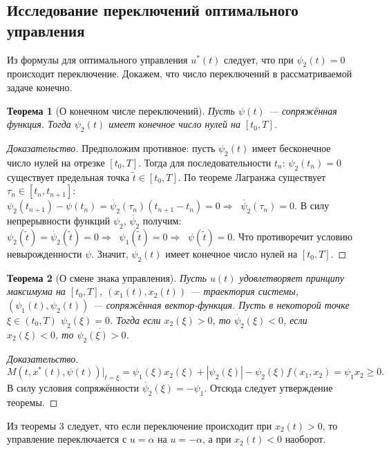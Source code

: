 \documentclass[11pt]{article}
\newtheorem{theorem}{Теорема}
\newcommand\abs[1]{\left\lvert#1\right\rvert}
\begin{document}
\subsection{Исследование переключений оптимального управления}
Из формулы для оптимального управления $u^*(t)$ следует, что при $\psi_2(t) = 0$ происходит переключение. Докажем, что число переключений в рассматриваемой задаче конечно.
\begin{theorem}[О конечном числе переключений]
Пусть $\psi(t)$ --- сопряжённая функция. Тогда $\psi_2(t)$ имеет конечное число нулей на $[t_0, T]$.
\end{theorem}
\begin{proof}[Доказательство]
Предположим противное: пусть $\psi_2(t)$ имеет бесконечное число нулей на отрезке $[t_0, T]$. Тогда для последовательности $t_n$: $\psi_2(t_n) = 0$ существует предельная точка $\tilde{t} \in [t_0, T]$. По теореме Лагранжа существует $\tau_n \in [t_n, t_{n+1}]$: $\psi_2(t_{n+1}) - \psi({t_n}) = \dot{\psi_2}(\tau_n)(t_{n+1} - t_n) = 0 \Rightarrow \; \; \dot{\psi_2}(\tau_n) = 0$. В силу непрерывности функций $\psi_2$, $\dot{\psi_2}$ получим: $\psi_2(\tilde{t}) = \dot{\psi_2}(\tilde{t}) = 0 \Rightarrow \; \; \psi_1(\tilde{t}) = 0 \Rightarrow \; \; \psi(\tilde{t}) = 0$.
Что противоречит условию невырожденности $\psi$. Значит, $\psi_2(t)$ имеет конечное число нулей на $[t_0, T]$.
\end{proof}

\begin{theorem}[О смене знака управления]
Пусть $u(t)$ удовлетворяет принципу максимума на $[t_0, T]$, $(x_1(t), x_2(t))$ --- траектория системы, $(\psi_1(t), \psi_2(t))$ --- сопряжённая вектор-функция. Пусть в некоторой точке $\xi \in (t_0, T)$ $\psi_2(\xi) = 0$. Тогда если $x_2(\xi) > 0$, то $\dot{\psi_2}(\xi) < 0$, если $x_2(\xi) < 0$, то $\dot{\psi_2(\xi) > 0}$.
\end{theorem}
\begin{proof}[Доказательство]
$$
M(t, x^*(t), \psi(t))\bigr\rvert_{t = \xi} = \psi_1(\xi) x_2(\xi) + \abs{\psi_2(\xi)} - \psi_2(\xi)f(x_1, x_2) = \psi_1 x_2 \geqslant 0.
$$
В силу условия сопряжённости $\dot{\psi_2}({\xi}) = -\psi_1$. Отсюда следует утверждение теоремы.
\end{proof}

Из теоремы 3 следует, что если переключение происходит при $x_2(t) > 0$, то управление переключается с $u = \alpha$ на $u = -\alpha$, а при $x_2(t) < 0$ наоборот.
\end{document}
